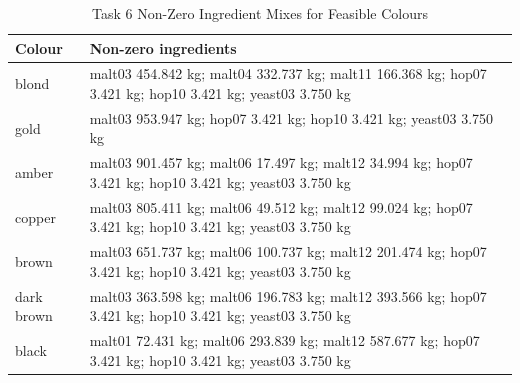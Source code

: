 \begin{table}[H]
\renewcommand{\arraystretch}{1.12}
\caption{Task 6 Non-Zero Ingredient Mixes for Feasible Colours}
\label{tab:task36-nonzero-ingredients}
\centering
\scriptsize
\begin{tabular}{@{}lp{}@{}}
\toprule
Colour & Non-zero ingredients \\
\midrule
blond & malt03 454.842 kg; malt04 332.737 kg; malt11 166.368 kg; hop07 3.421 kg; hop10 3.421 kg; yeast03 3.750 kg \\
gold & malt03 953.947 kg; hop07 3.421 kg; hop10 3.421 kg; yeast03 3.750 kg \\
amber & malt03 901.457 kg; malt06 17.497 kg; malt12 34.994 kg; hop07 3.421 kg; hop10 3.421 kg; yeast03 3.750 kg \\
copper & malt03 805.411 kg; malt06 49.512 kg; malt12 99.024 kg; hop07 3.421 kg; hop10 3.421 kg; yeast03 3.750 kg \\
brown & malt03 651.737 kg; malt06 100.737 kg; malt12 201.474 kg; hop07 3.421 kg; hop10 3.421 kg; yeast03 3.750 kg \\
dark brown & malt03 363.598 kg; malt06 196.783 kg; malt12 393.566 kg; hop07 3.421 kg; hop10 3.421 kg; yeast03 3.750 kg \\
black & malt01 72.431 kg; malt06 293.839 kg; malt12 587.677 kg; hop07 3.421 kg; hop10 3.421 kg; yeast03 3.750 kg \\
\bottomrule
\end{tabular}
\end{table}
